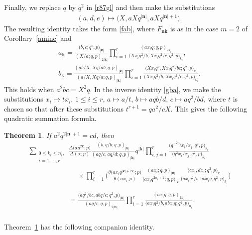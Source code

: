 \documentclass[pdftex]{sigma}%
\numberwithin{equation}{section}
\newtheorem{Theorem}{Theorem}[section]
\newcommand\bn{\mathbf n}
\newcommand\bk{\mathbf k}
\newcommand\bx{\mathbf x}
\begin{document}
Finally, we replace $q$ by $q^2$ in \eqref{r87gl} and then make the substitutions
\begin{gather*}
(a,d,e)\mapsto \big(X,aXq^{|\bn|},aXq^{|\bn|+1}\big).
\end{gather*}
 The resulting identity takes the form
 \eqref{fab}, where $F_{\bn\bk}$ is as in the case $m=2$ of Corollary~\ref{aminc} and
\begin{gather*}
a_{\bk}=\frac{\big(b,c;q^2,p\big)_{|\bk|}}{(X/a;q,p)_{2|\bk|}}
\prod\limits_{i=1}^r\frac{(ax_iq;q,p)_{2k_i}}{\big(Xx_iq^2/b,Xx_iq^2/c;q^2,p\big)_{k_i}},
\\
b_{\bk}=\frac{(ab/X,Xq/ab;q,p)_{|\bk|}}{(a/X,Xq/a;q,p)_{|\bk|}}
\prod\limits_{i=1}^r\frac{\big(X x_iq^2,Xx_iq^2/bc;q^2,p\big)_{k_i}}{\big(Xx_iq^2/b,Xx_iq^2/c;q^2,p\big)_{k_i}}.
\end{gather*}
This holds when $a^2bc=X^2q$. In the inverse identity \eqref{gba}, we make the substitutions
$x_i\mapsto tx_i$, $1\leq i\leq r$, $a\mapsto a/t$, $b\mapsto aqb/d$, $c\mapsto aq^2/bd$,
where $t$ is chosen so that after these substitutions $t^{r+1}=q	a^2/cX$. This gives the following quadratic summation formula.

\begin{Theorem}\label{aqst}
If $a^2q^{2|\bn|+1}=cd$, then
\begin{gather*}
\sum_{\substack{0\leq k_i\leq n_i,\\ i=1,\dots,r}}
\frac{\Delta\big(\bx q^{2\bk};p\big)}{\Delta(\bx;p)}
\frac{(b,q/b;q,p)_{|\bk|}}{(aq/c,aq/d;q,p)_{|\bk|}} q^{|\bk|}\prod\limits_{i,j=1}^r
\frac{\big(q^{-2n_j}x_i/x_j;q^2,p\big)_{k_i}}{\big(q^2x_i/x_j;q^2,p\big)_{k_i}}
\\ \phantom{\sum_{\substack{0\leq k_i\leq n_i,\\ i=1,\dots,r}}=}{}
\times\prod\limits_{i=1}^r\bigg(\frac{\theta\big(ax_iq^{|\bk|+2k_i};p\big)}{\theta(ax_i;p)}
\frac{(ax_i;q,p)_{|\bk|}}{\big(ax_i q^{2n_i+1};q,p\big)_{|\bk|}}\frac{\big(cx_i,dx_i;q^2,p\big)_{k_i}}
{\big(ax_iq^2/b,abx_iq;q^2,p\big)_{k_i}}\bigg)
\\ \phantom{\sum_{\substack{0\leq k_i\leq n_i,\\ i=1,\dots,r}}}{}
=\frac{\big(aq^2/bc,abq/c;q^2,p\big)_{|\bn|}}{(aq/c;q,p)_{2|\bn|}}\prod\limits_{i=1}^r\frac{(ax_iq;q,p)_{2n_i}} {\big(ax_iq^2/b,abx_iq;q^2,p\big)_{n_i}}.
\end{gather*}
\end{Theorem}


 Theorem~\ref{aqst} has the following companion identity.
\end{document}
